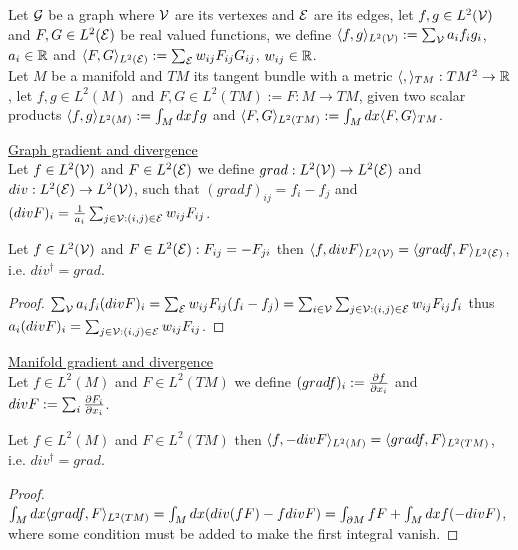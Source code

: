 \documentclass[../main.tex]{subfiles}
\begin{document}
\begin{defn}
    Let $\mathcal{G}$ be a graph where $\mathcal{V}$ are its vertexes and $\mathcal{E}$ are its edges, let $f,g \in L^2(\mathcal{V})$ 
    and $F,G \in L^2(\mathcal{E})$ be real valued functions, we define
    $\langle f, g \rangle_{L^2(\mathcal{V})} := \sum_{\mathcal{V}} a_i f_i g_i$, $a_i \in \mathbb{R}$ and
    $\langle F, G \rangle_{L^2(\mathcal{E})} := \sum_{\mathcal{E}} w_{ij} F_{ij} G_{ij}$, $w_{ij} \in \mathbb{R}$.\\
    Let $M$ be a manifold and $TM$ its tangent bundle with a metric $\langle ,  \rangle_{TM} : TM^2 \to \mathbb{R}$, let $f,g \in L^2(M)$ 
    and $F,G \in L^2(TM) := {F : M \to TM}$, given two scalar products
    $\langle f, g \rangle_{L^2(M)} := \int_M dx f g$ and $\langle F, G \rangle_{L^2(TM)} := \int_M dx \langle F, G \rangle_{TM}$.
\end{defn}
        
\begin{defn}
    \underline{Graph gradient and divergence}\\ 
    Let $f \in L^2(\mathcal{V})$ and $F \in L^2(\mathcal{E})$ we define $grad : L^2(\mathcal{V}) \to L^2(\mathcal{E})$ and $div : L^2(\mathcal{E}) \to L^2(\mathcal{V})$,
    such that $(gradf)_{ij}=f_i-f_j$ and $(divF)_i=\frac{1}{a_i}\sum_{j \in \mathcal{V} : (i,j) \in \mathcal{E}} w_{ij} F_{ij}$.
\end{defn}

\begin{prop}
    Let $f \in L^2(\mathcal{V})$ and $F \in L^2(\mathcal{E}) : F_{ij}=-F_{ji}$ then $\langle f, divF \rangle_{L^2(\mathcal{V})} = \langle gradf, F \rangle_{L^2(\mathcal{E})}$,
    i.e. $div^\dag = grad$.
\end{prop}
\begin{proof}
    $\sum_{\mathcal{V}} a_i f_i (divF)_i = \sum_{\mathcal{E}} w_{ij} F_{ij} (f_i-f_j) = \sum_{i \in \mathcal{V}}\sum_{j \in \mathcal{V} : (i,j) \in \mathcal{E}} w_{ij} F_{ij} f_i$
    thus $a_i (divF)_i = \sum_{j \in \mathcal{V} : (i,j) \in \mathcal{E}} w_{ij} F_{ij}$.
\end{proof}

\begin{defn}
    \underline{Manifold gradient and divergence}\\
    Let $f \in L^2(M)$ and $F \in L^2(TM)$ we define $(grad f)_i := \frac{\partial f}{\partial x_i}$ and $div F := \sum_i \frac{\partial F_i}{\partial x_i}$.
\end{defn}

\begin{prop}
    Let $f \in L^2(M)$ and $F \in L^2(TM)$ then $\langle f, -divF \rangle_{L^2(M)} = \langle gradf, F \rangle_{L^2(TM)}$,
    i.e. $div^\dag = grad$.
\end{prop}
\begin{proof}
    $\int_M dx \langle grad f, F \rangle_{L^2(TM)} = \int_M dx ( div(fF) - f divF) = \int_{\partial M} fF + \int_M dx f(-divF)$,
    where some condition must be added to make the first integral vanish.
\end{proof}
\end{document}
